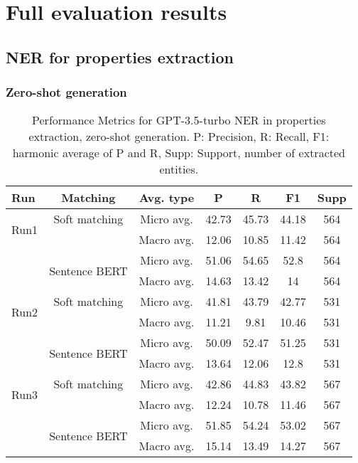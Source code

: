 

\section{Full evaluation results}

\subsection{NER for properties extraction}

\subsubsection{Zero-shot generation}
\begin{table}[htbp]
\small
  \centering
  \caption{Performance Metrics for GPT-3.5-turbo NER in properties extraction, zero-shot generation. P: Precision, R: Recall, F1: harmonic average of P and R, Supp: Support, number of extracted entities.}
  \begin{tabular}{lcccccc}
    \toprule
    \textbf{Run} & \textbf{Matching} & \textbf{Avg. type} & \textbf{P} & \textbf{R} & \textbf{F1} & \textbf{Supp} \\
    \midrule
    \multirow{2}{*}{Run1} & Soft matching & Micro avg. & 42.73 & 45.73 & 44.18 & 564 \\
    & & Macro avg. & 12.06 & 10.85 & 11.42 & 564 \\
    \cmidrule{2-7}
    & \multirow{2}{*}{Sentence BERT} & Micro avg. & 51.06 & 54.65 & 52.8 & 564 \\
    & & Macro avg. & 14.63 & 13.42 & 14 & 564 \\
    \midrule
    \multirow{2}{*}{Run2} & Soft matching & Micro avg. & 41.81 & 43.79 & 42.77 & 531 \\
    & & Macro avg. & 11.21 & 9.81 & 10.46 & 531 \\
    \cmidrule{2-7}
    & \multirow{2}{*}{Sentence BERT} & Micro avg. & 50.09 & 52.47 & 51.25 & 531 \\
    & & Macro avg. & 13.64 & 12.06 & 12.8 & 531 \\
    \midrule
    \multirow{2}{*}{Run3} & Soft matching & Micro avg. & 42.86 & 44.83 & 43.82 & 567 \\
    & & Macro avg. & 12.24 & 10.78 & 11.46 & 567 \\
    \cmidrule{2-7}
    & \multirow{2}{*}{Sentence BERT} & Micro avg. & 51.85 & 54.24 & 53.02 & 567 \\
    & & Macro avg. & 15.14 & 13.49 & 14.27 & 567 \\

\end{tabular}
\end{table}
